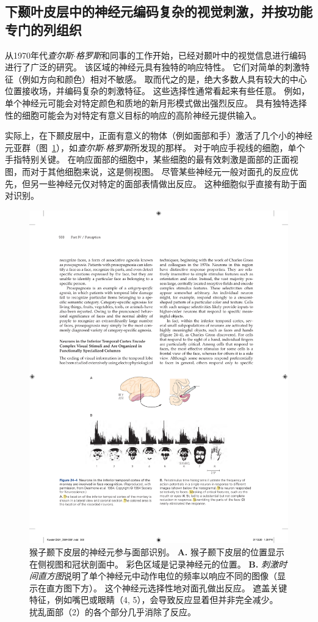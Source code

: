 \subsection{下颞叶皮层中的神经元编码复杂的视觉刺激，并按功能专门的列组织}

从1970年代\textit{查尔斯$\cdot$格罗斯}和同事的工作开始，已经对颞叶中的视觉信息进行编码进行了广泛的研究。
该区域的神经元具有独特的响应特性。
它们对简单的刺激特征（例如方向和颜色）相对不敏感。 
取而代之的是，绝大多数人具有较大的中心位置接收场，并编码复杂的刺激特征。
这些选择性通常看起来有些任意。
例如，单个神经元可能会对特定颜色和质地的新月形模式做出强烈反应。
具有独特选择性的细胞可能会为对特定有意义目标的响应的高阶神经元提供输入。


实际上，在下颞皮层中，正面有意义的物体（例如面部和手）激活了几个小的神经元亚群（图~\ref{fig:24_4}），如\textit{查尔斯$\cdot$格罗斯}所发现的那样。
对于响应手视线的细胞，单个手指特别关键。
在响应面部的细胞中，某些细胞的最有效刺激是面部的正面视图，而对于其他细胞来说，这是侧视图。
尽管某些神经元一般对面孔的反应优先，但另一些神经元仅对特定的面部表情做出反应。
这种细胞似乎直接有助于面对识别。


\begin{figure}[htbp]
	\centering
	\includegraphics[width=0.95\linewidth]{chap24/fig_24_4}
	\caption{猴子颞下皮层的神经元参与面部识别。
		\textbf{A.} 猴子颞下皮层的位置显示在侧视图和冠状剖面中。 彩色区域是记录神经元的位置。 
		\textbf{B.} \textit{刺激时间直方图}说明了单个神经元中动作电位的频率以响应不同的图像（显示在直方图下方）。
		这个神经元选择性地对面孔做出反应。
		遮盖关键特征，例如嘴巴或眼睛（4, 5），会导致反应显着但并非完全减少。
		扰乱面部（2）的各个部分几乎消除了反应。}
	\label{fig:24_4}
\end{figure}


